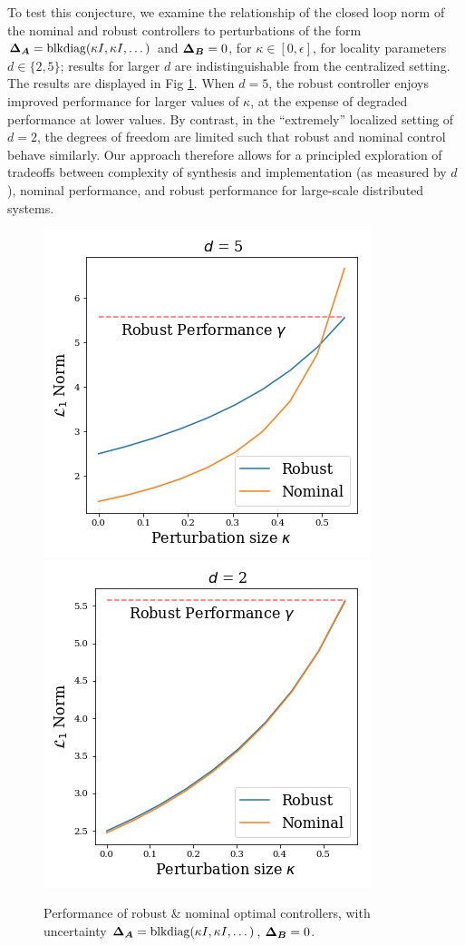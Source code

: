 To test this conjecture, we examine the relationship of the closed loop norm of the nominal and robust controllers to perturbations of the form ${\boldsymbol{\Delta}}_{\boldsymbol{A}} = \mathrm{blkdiag}(\kappa I, \kappa I, \dots)$ and ${\boldsymbol{\Delta}}_{\boldsymbol{B}} = 0$, for $\kappa \in [0,\epsilon]$, for locality parameters $d\in\{2,5\}$; results for larger $d$ are indistinguishable from the centralized setting. The results are displayed in Fig \ref{fig:kappa}.  When $d=5$, the robust controller enjoys improved performance for larger values of $\kappa$, at the expense of degraded performance at lower values. By contrast, in the ``extremely'' localized setting of $d=2$, the degrees of freedom are limited such that robust and nominal control behave similarly.  Our approach therefore allows for a principled exploration of tradeoffs between complexity of synthesis and implementation (as measured by $d$), nominal performance, and robust performance for large-scale distributed systems.

\begin{figure}
\includegraphics[width=.45\columnwidth]{d5.png}~\includegraphics[width=.45\columnwidth]{d2.png}
\caption{Performance of robust \& nominal optimal controllers, with uncertainty  ${\boldsymbol{\Delta}}_{\boldsymbol{A}} = \mathrm{blkdiag}(\kappa I, \kappa I, \dots)$, ${\boldsymbol{\Delta}}_{\boldsymbol{B}} = 0$. }%
\label{fig:kappa}
\end{figure}

